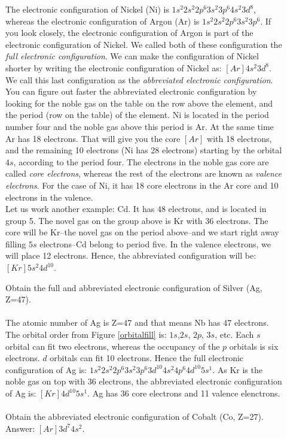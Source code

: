 \documentclass[main.tex]{subfiles}
\begin{document}
\begin{description}
\item[] The electronic configuration of Nickel (Ni) is  $1s^2 2s^2 2p^6 3s^2 3p^6 4s^2 3d^8$, whereas the electronic configuration of Argon (Ar) is  $1s^2 2s^2 2p^6 3s^2 3p^6 $. If you look closely, the electronic configuration of Argon is part of the electronic configuration of Nickel. We called both of these configuration the \emph{full electronic configuration}. We can make the configuration of Nickel shorter by writing the electronic configuration of Nickel as: $[Ar]4s^2 3d^8$. We call this last configuration as the \emph{abbreviated electronic configuration}. You can figure out faster the abbreviated electronic configuration by looking for the noble gas on the table on the row above the element, and the period (row on the table) of the element. Ni is located in the period number four and the noble gas above this period is Ar. At the same time Ar has 18 electrons. That will give you the core $[Ar]$ with 18 electrons, and the remaining 10 electrons (Ni has 28 electrons) starting by the orbital $4s$, according to the period four. The electrons in the noble gas core are called \emph{core electrons}, whereas the rest of the electrons are known as \emph{valence electrons}. For the case of Ni, it has 18 core electrons in the Ar core and 10 electrons in the valence.\\
Let us work another example: Cd. It has 48 electrons, and is located in group 5. The novel gas on the group above is Kr with 36 electrons. The core will be Kr--the novel gas on the period above--and we start right away filling $5s$ electrons--Cd belong to period five. In the valence electrons, we will place 12 electrons. Hence, the abbreviated configuration will be: $[Kr]5s^{2}4d^{10}$. 


\begin{example} %
Obtain the full and abbreviated electronic configuration of Silver (Ag, Z=47).\\
\textlcsc{ \textcolor{dgreen}{\Large Solution} }\\
The atomic number of Ag is Z=47 and that means Nb has 47 electrons. The orbital order from Figure \ref{orbitalfill} is: $1s$,$2s$, $2p$, $3s$, etc. Each $s$ orbital can fit two electrons, whereas the occupancy of  the $p$ orbitals is six electrons. $d$ orbitals can fit 10 electrons. Hence the full electronic configuration of Ag is: 
$1s^2 2s^2 2p^6 3s^2 3p^6 3d^{10} 4s^2 4p^6 4d^{10} 5s^1$. As Kr is the noble gas on top with 36 electrons, the abbreviated electronic configuration of Ag is: $[Kr] 4d^{10} 5s^1$. Ag has 36 core electrons and 11 valence elenctrons.
\\
\faDiamond\ \\
Obtain the abbreviated electronic configuration of Cobalt (Co, Z=27).
\flushright Answer: $ [Ar] 3d^7 4s^2$. 
\end{example}
\begin{marginfigure}
\end{marginfigure}%



\end{description}
\end{document}
